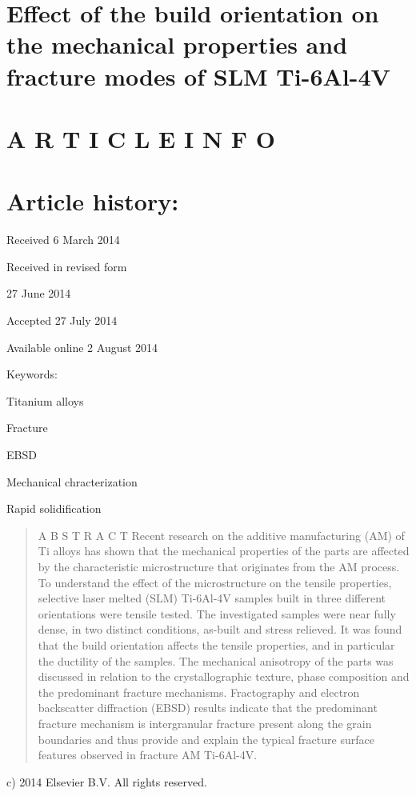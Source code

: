 \documentclass[10pt]{article}
\begin{document}
\section*{Effect of the build orientation on the mechanical properties and fracture modes of SLM Ti-6Al-4V }


\section*{A R T I C L E I N F O}
\section*{Article history:}
Received 6 March 2014

Received in revised form

27 June 2014

Accepted 27 July 2014

Available online 2 August 2014

Keywords:

Titanium alloys

Fracture

EBSD

Mechanical chracterization

Rapid solidification

\begin{abstract}
A B S T R A C T Recent research on the additive manufacturing (AM) of Ti alloys has shown that the mechanical properties of the parts are affected by the characteristic microstructure that originates from the AM process. To understand the effect of the microstructure on the tensile properties, selective laser melted (SLM) Ti-6Al-4V samples built in three different orientations were tensile tested. The investigated samples were near fully dense, in two distinct conditions, as-built and stress relieved. It was found that the build orientation affects the tensile properties, and in particular the ductility of the samples. The mechanical anisotropy of the parts was discussed in relation to the crystallographic texture, phase composition and the predominant fracture mechanisms. Fractography and electron backscatter diffraction (EBSD) results indicate that the predominant fracture mechanism is intergranular fracture present along the grain boundaries and thus provide and explain the typical fracture surface features observed in fracture AM Ti-6Al-4V.
\end{abstract}

c) 2014 Elsevier B.V. All rights reserved.
\end{document}
